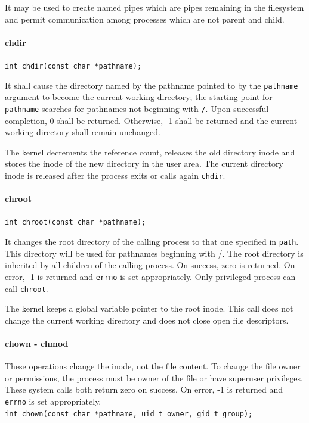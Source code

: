 It may be used to create named pipes which are pipes remaining in the filesystem and permit communication among processes which are not parent and child.

\paragraph{chdir}
\texttt{int chdir(const char *pathname);}

It shall cause the directory named by the pathname pointed to by the \texttt{pathname} argument to become the current working directory; the starting point for \texttt{pathname} searches for pathnames not beginning with \texttt{/}. Upon successful completion, 0 shall be returned. Otherwise, -1 shall be returned and the current working directory shall remain unchanged. 

The kernel decrements the reference count, releases the old directory inode and stores the inode of the new directory in the user area. The current directory inode is released after the process exits or calls again \texttt{chdir}.

\paragraph{chroot}
\texttt{int chroot(const char *pathname);}

It changes the root directory of the calling process to that one specified in \texttt{path}. This directory will be used for pathnames beginning with /. The root directory is inherited by all children of the calling process. On success, zero is returned. On error, -1 is returned and \texttt{errno} is set appropriately. Only privileged process can call \texttt{chroot}.

The kernel keeps a global variable pointer to the root inode. This call does not change the current working directory and does not close open file descriptors.

\paragraph{chown - chmod}
These operations change the inode, not the file content. To change the file owner or permissions, the process must be owner of the file or have superuser privileges. These system calls both return zero on success. On error, -1 is returned and \texttt{errno} is set appropriately.
\\
\texttt{int chown(const char *pathname, uid\_t owner, gid\_t group);}

